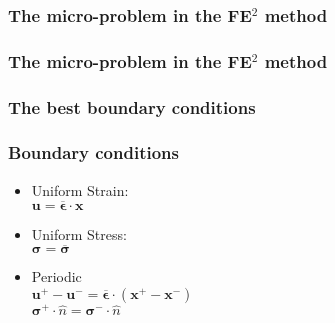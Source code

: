 \documentclass[usenames,dvipsnames]{beamer}
\begin{document}

\begin{frame}
\frametitle{The micro-problem in the FE$^2$ method}
\begin{figure}[!ht]
\resizebox{0.8\linewidth}{!}{}
\end{figure}
\end{frame}


\begin{frame}
\frametitle{The micro-problem in the FE$^2$ method}
\begin{figure}[!ht]
\resizebox{1.0\linewidth}{!}{}
\end{figure}
\end{frame}


\begin{frame}
\frametitle{The best boundary conditions}
\begin{figure}[!ht]
\resizebox{0.6\linewidth}{!}{}
\end{figure}
\end{frame}


\begin{frame}
\frametitle{Boundary conditions}

\begin{minipage}[h]{0.49\linewidth}
\begin{itemize}
\item Uniform Strain: \\ $\bm{u} = \overline{\bm{\epsilon}} \cdot \bm{x} $
  \vspace{0.5cm}
\item Uniform Stress: \\$ \bm{\sigma} = \overline{\bm{\sigma}} $
  \vspace{0.5cm}
\item Periodic \\
$ \bm{u}^+ - \bm{u}^- = \overline{\bm{\epsilon}} \cdot (\bm{x}^+ - \bm{x}^-) $\\
$ \bm{\sigma}^+ \cdot \hat{n}  = \bm{\sigma}^- \cdot \hat{n}$
\end{itemize}
\end{minipage}
\begin{minipage}[h]{0.49\linewidth}
\resizebox{0.8\linewidth}{!}{}
\end{minipage}

\end{frame}
\end{document}

